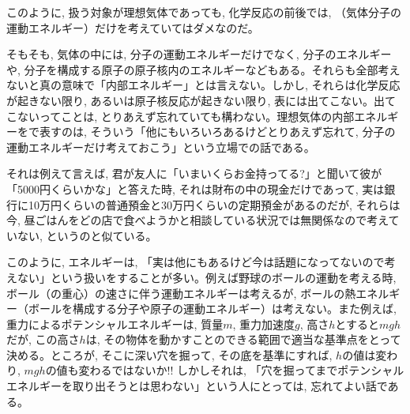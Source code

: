 このように, 扱う対象が理想気体であっても, 化学反応の前後では, （気体分子の運動エネルギー）だけを考えていてはダメなのだ。

そもそも, 気体の中には, 分子の運動エネルギーだけでなく, 分子のエネルギーや, 分子を構成する原子の原子核内のエネルギーなどもある。それらも全部考えないと真の意味で「内部エネルギー」とは言えない。しかし, それらは化学反応が起きない限り, あるいは原子核反応が起きない限り, 表には出てこない。出てこないってことは, とりあえず忘れていても構わない。理想気体の内部エネルギーをで表すのは, そういう「他にもいろいろあるけどとりあえず忘れて, 分子の運動エネルギーだけ考えておこう」という立場での話である。

それは例えて言えば, 君が友人に「いまいくらお金持ってる?」と聞いて彼が「5000円くらいかな」と答えた時, それは財布の中の現金だけであって, 実は銀行に10万円くらいの普通預金と30万円くらいの定期預金があるのだが, それらは今, 昼ごはんをどの店で食べようかと相談している状況では無関係なので考えていない, というのと似ている。

このように, エネルギーは, 「実は他にもあるけど今は話題になってないので考えない」という扱いをすることが多い。例えば野球のボールの運動を考える時, ボール（の重心）の速さに伴う運動エネルギーは考えるが, ボールの熱エネルギー（ボールを構成する分子や原子の運動エネルギー）は考えない。また例えば, 重力によるポテンシャルエネルギーは, 質量$m$, 重力加速度$g$, 高さ$h$とすると$mgh$だが, この高さ$h$は, その物体を動かすことのできる範囲で適当な基準点をとって決める。ところが, そこに深い穴を掘って, その底を基準にすれば, $h$の値は変わり, $mgh$の値も変わるではないか!! しかしそれは, 「穴を掘ってまでポテンシャルエネルギーを取り出そうとは思わない」という人にとっては, 忘れてよい話である。\\

